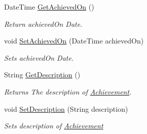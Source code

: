 \begin{DoxyCompactItemize}
Date\+Time \hyperlink{classcom_1_1shephertz_1_1app42_1_1paas_1_1sdk_1_1windows_1_1achievement_1_1_achievement_abeb2b53d99d897a8028eecff1e05d7f6}{Get\+Achieved\+On} ()
\begin{DoxyCompactList}\small\item\em Return achieved\+On Date. \end{DoxyCompactList}\item 
void \hyperlink{classcom_1_1shephertz_1_1app42_1_1paas_1_1sdk_1_1windows_1_1achievement_1_1_achievement_a6ff7854a0b7640b9d622f21916eb5d99}{Set\+Achieved\+On} (Date\+Time achieved\+On)
\begin{DoxyCompactList}\small\item\em Sets achieved\+On Date. \end{DoxyCompactList}\item 
String \hyperlink{classcom_1_1shephertz_1_1app42_1_1paas_1_1sdk_1_1windows_1_1achievement_1_1_achievement_a4e5ce4c363b077e29a0f4d82a11dc047}{Get\+Description} ()
\begin{DoxyCompactList}\small\item\em Returns The description of \hyperlink{classcom_1_1shephertz_1_1app42_1_1paas_1_1sdk_1_1windows_1_1achievement_1_1_achievement}{Achievement}. \end{DoxyCompactList}\item 
void \hyperlink{classcom_1_1shephertz_1_1app42_1_1paas_1_1sdk_1_1windows_1_1achievement_1_1_achievement_a2686bad65d5713faadb03253a4c9e219}{Set\+Description} (String description)
\begin{DoxyCompactList}\small\item\em Sets description of \hyperlink{classcom_1_1shephertz_1_1app42_1_1paas_1_1sdk_1_1windows_1_1achievement_1_1_achievement}{Achievement} \end{DoxyCompactList}\end{DoxyCompactItemize}
